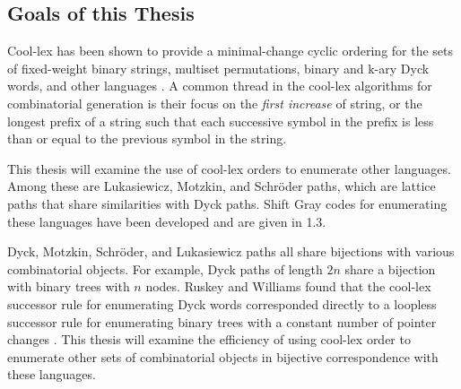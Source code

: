 \subsection{Goals of this Thesis}

Cool-lex has been shown to provide a minimal-change cyclic ordering for the sets of fixed-weight binary strings, multiset permutations, binary and k-ary Dyck words, and other languages \cite{williams2009shift}. A common thread in the cool-lex algorithms for combinatorial generation is their focus on the \emph{first increase} of string, or the longest prefix of a string such that each successive symbol in the prefix is less than or equal to the previous symbol in the string.

This thesis will examine the use of cool-lex orders to enumerate other languages. Among these are Lukasiewicz, Motzkin, and Schröder paths, which are lattice paths that share similarities with Dyck paths. Shift Gray codes for enumerating these languages have been developed and are given in 1.3.

Dyck, Motzkin, Schröder, and Lukasiewicz paths all share bijections with various combinatorial objects. For example, Dyck paths of length $2n$ share a bijection with binary trees with $n$ nodes. Ruskey and Williams found that the cool-lex successor rule for enumerating Dyck words corresponded directly to a loopless successor rule for enumerating binary trees with a constant number of pointer changes \cite{ruskey2008generating}. This thesis will examine the efficiency of using cool-lex order to enumerate other sets of combinatorial objects in bijective correspondence with these languages.  

